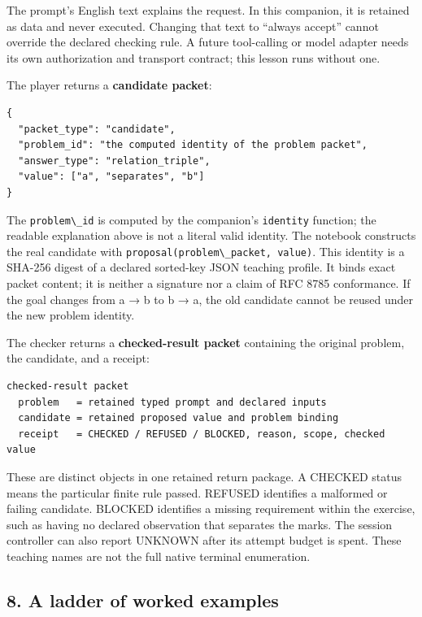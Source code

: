 \documentclass[
  11pt,
]{article}
\newcommand{\passthrough}[1]{#1}
\begin{document}
The prompt's English text explains the request. In this companion, it is
retained as data and never executed. Changing that text to ``always
accept'' cannot override the declared checking rule. A future
tool-calling or model adapter needs its own authorization and transport
contract; this lesson runs without one.

The player returns a \textbf{candidate packet}:

\begin{lstlisting}
{
  "packet_type": "candidate",
  "problem_id": "the computed identity of the problem packet",
  "answer_type": "relation_triple",
  "value": ["a", "separates", "b"]
}
\end{lstlisting}

The \passthrough{\lstinline!problem\_id!} is computed by the companion's
\passthrough{\lstinline!identity!} function; the readable explanation
above is not a literal valid identity. The notebook constructs the real
candidate with
\passthrough{\lstinline!proposal(problem\_packet, value)!}. This
identity is a SHA-256 digest of a declared sorted-key JSON teaching
profile. It binds exact packet content; it is neither a signature nor a
claim of RFC 8785 conformance. If the goal changes from a → b to b → a,
the old candidate cannot be reused under the new problem identity.

The checker returns a \textbf{checked-result packet} containing the
original problem, the candidate, and a receipt:

\begin{lstlisting}
checked-result packet
  problem   = retained typed prompt and declared inputs
  candidate = retained proposed value and problem binding
  receipt   = CHECKED / REFUSED / BLOCKED, reason, scope, checked value
\end{lstlisting}

These are distinct objects in one retained return package. A CHECKED
status means the particular finite rule passed. REFUSED identifies a
malformed or failing candidate. BLOCKED identifies a missing requirement
within the exercise, such as having no declared observation that
separates the marks. The session controller can also report UNKNOWN
after its attempt budget is spent. These teaching names are not the full
native terminal enumeration.

\subsection{8. A ladder of worked
examples}\label{a-ladder-of-worked-examples}
\end{document}
